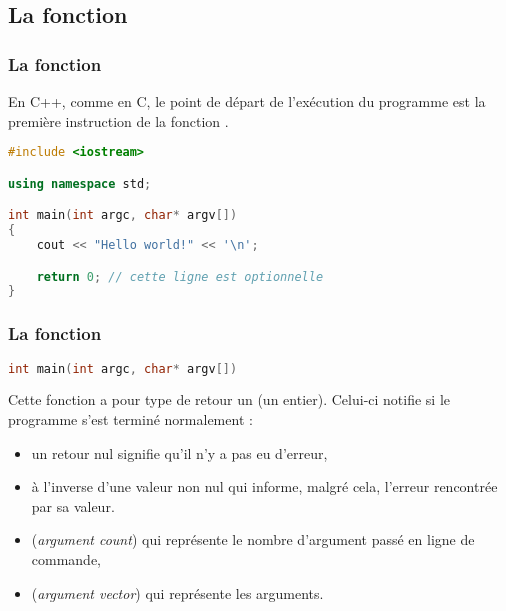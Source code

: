 \documentclass{cppcourses}
\begin{document}
\subsection{La fonction }

\begin{frame}[fragile]

\frametitle{La fonction }

En C++, comme en C, le point de départ de l'exécution du programme est la première instruction de la fonction .

\begin{lstlisting}[language = c++]
#include <iostream>

using namespace std;

int main(int argc, char* argv[])
{
    cout << "Hello world!" << '\n';

    return 0; // cette ligne est optionnelle
}
\end{lstlisting}


\end{frame}

\begin{frame}[fragile]

\frametitle{La fonction }

\begin{lstlisting}[language = c++]
int main(int argc, char* argv[])
\end{lstlisting}

Cette fonction a pour type de retour un  (un entier). Celui-ci notifie si le programme s'est terminé normalement :

\begin{itemize}
    \item<2-> un retour nul signifie qu'il n'y a pas eu d'erreur,
    \item<3-> à l'inverse d'une valeur non nul qui informe, malgré cela, l'erreur rencontrée par sa valeur.
\end{itemize}


\begin{itemize}
    \item<5->  (\emph{argument count}) qui représente le nombre d'argument passé en ligne de commande,
    \item<6->  (\emph{argument vector}) qui représente les arguments.
\end{itemize}


\end{frame}
\end{document}
